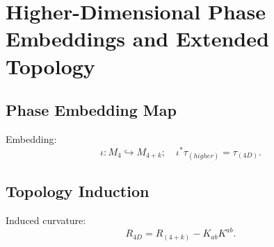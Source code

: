\chapter{Higher-Dimensional Phase Embeddings and Extended Topology}

\section{Phase Embedding Map}
Embedding:
\[
\iota: M_4 \hookrightarrow M_{4+k};\quad \iota^\ast \tau_{(higher)} = \tau_{(4D)}.
\]

\section{Topology Induction}
Induced curvature:
\[
R_{4D} = R_{(4+k)} - K_{ab}K^{ab}.
\]

